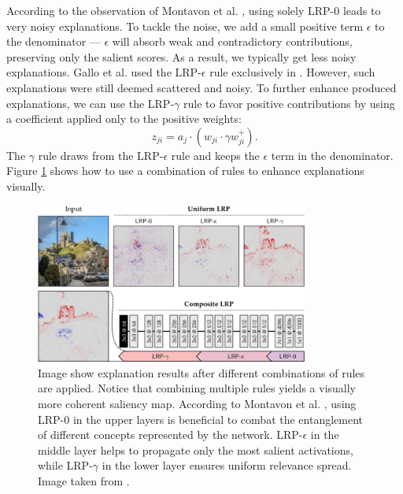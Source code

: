 According to the observation of Montavon et al. \cite{lrp}, using solely LRP-$0$ leads to very noisy explanations.
To tackle the noise, we add a small positive term $\epsilon$ to the denominator --- $\epsilon$ will absorb weak and contradictory contributions, preserving only the salient scores. 
As a result, we typically get less noisy explanations.
Gallo et al. used the LRP-$\epsilon$ rule exclusively in \cite{gallo}.
However, such explanations were still deemed scattered and noisy.
To further enhance produced explanations, we can use the LRP-$\gamma$ rule to favor positive contributions by using a coefficient applied only to the positive weights:
\begin{equation}
    z_{ji} = {a_j \cdot (w_{ji} \cdot \gamma w_{ji}^+)}.
\end{equation}
The $\gamma$ rule draws from the LRP-$\epsilon$ rule and keeps the $\epsilon$ term in the denominator.
Figure \ref{fig:lrp-montavon} shows how to use a combination of rules to enhance explanations visually.

\begin{figure}[h]
    \centering
      \includegraphics[width=0.8\textwidth]{img/lrp-montavon.png}
    \caption{Image show explanation results after different combinations of rules are applied. Notice that combining multiple rules yields a visually more coherent saliency map. According to Montavon et al. \cite{lrp}, using LRP-$0$ in the upper layers is beneficial to combat the entanglement of different concepts represented by the network. LRP-$\epsilon$ in the middle layer helps to propagate only the most salient activations, while LRP-$\gamma$ in the lower layer ensures uniform relevance spread. Image taken from \cite{lrp}.}
    \label{fig:lrp-montavon}
\end{figure}